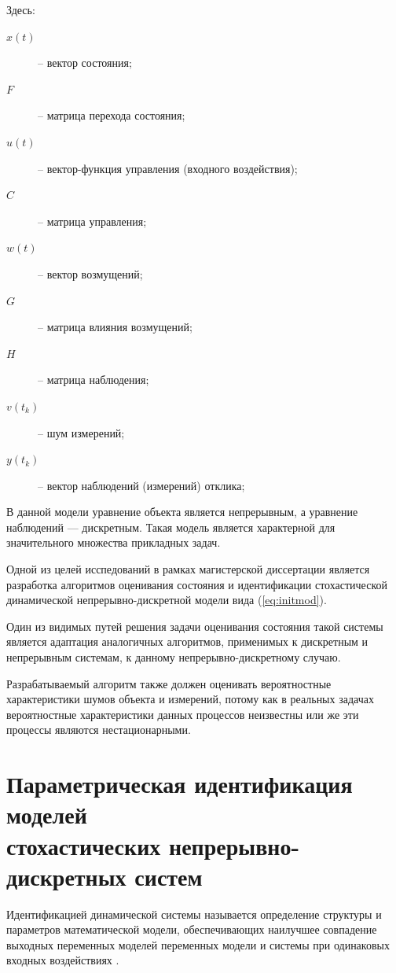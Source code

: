 \documentclass[a4paper,14pt]{extarticle}
\let\oldref\ref
\renewcommand{\ref}[1]{(\oldref{#1})}
\begin{document}
Здесь:
\begin{description}
	\item [$x(t)$] -- вектор состояния;
	\item [$F$] -- матрица перехода состояния;
	\item [$u(t)$] -- вектор-функция управления (входного воздействия);
	\item [$C$] -- матрица управления;
	\item [$w(t)$] -- вектор возмущений;
	\item [$G$] -- матрица влияния возмущений;
	\item [$H$] -- матрица наблюдения;
	\item [$v(t_k)$] -- шум измерений;
	\item [$y(t_k)$] -- вектор наблюдений (измерений) отклика;
\end{description}

В данной модели уравнение объекта является непрерывным, а уравнение наблюдений
--- дискретным. Такая модель является характерной для значительного множества
прикладных задач.

Одной из целей исспедований в рамках магистерской диссертации является
разработка алгоритмов оценивания состояния и идентификации стохастической 
динамической непрерывно-дискретной модели вида \ref{eq:initmod}. 

Один из видимых путей решения задачи оценивания состояния такой системы
является адаптация аналогичных алгоритмов, применимых к дискретным и
непрерывным системам, к данному непрерывно-дискретному случаю.

Разрабатываемый алгоритм также должен оценивать вероятностные характеристики
шумов объекта и измерений, потому как в реальных задачах вероятностные
характеристики данных процессов неизвестны или же эти процессы являются
нестационарными.

\section[Параметрическая идентификация моделей стохастических
\\непрерывно-дискретных систем]
{Параметрическая идентификация моделей \\стохастических
непрерывно-дискретных систем} 

Идентификацией динамической системы называется определение структуры и
параметров математической модели, обеспечивающих наилучшее совпадение выходных
переменных моделей переменных модели и системы при одинаковых входных
воздействиях \cite{chubich}.
\end{document}
